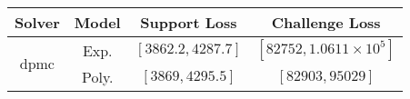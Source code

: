 \begin{tabular}{cc|c|c} 
\hline 
 Solver & Model & Support Loss  & Challenge Loss \tabularnewline\hline 
\hline 
\multirow{2}{*}{dpmc} & Exp. & $\left[3862.2,4287.7\right]$ & $\left[82752,1.0611\times10^{5}\right]$ \tabularnewline 
 & Poly. & $\left[3869,4295.5\right]$ & $\left[82903,95029\right]$ \tabularnewline 
\hline 
\end{tabular} 

